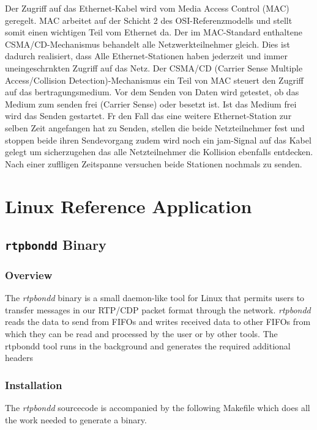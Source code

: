 \documentclass[a4paper]{book}%
\begin{document}
Der Zugriff auf das Ethernet-Kabel wird vom Media Access Control (MAC) geregelt. MAC arbeitet auf der Schicht 2 des OSI-Referenzmodells und stellt somit einen wichtigen Teil vom Ethernet da. Der im MAC-Standard enthaltene CSMA/CD-Mechanismus behandelt alle Netzwerkteilnehmer gleich. Dies ist dadurch realisiert, dass Alle Ethernet-Stationen haben jederzeit und immer uneingeschrnkten Zugriff auf das Netz. Der CSMA/CD (Carrier Sense Multiple Access/Collision Detection)-Mechanismus ein Teil von MAC steuert den Zugriff auf das bertragungsmedium. Vor dem Senden von Daten wird getestet, ob das Medium zum senden frei (Carrier Sense) oder besetzt ist. Ist das Medium frei wird das Senden gestartet. Fr den Fall das eine weitere Ethernet-Station zur selben Zeit angefangen hat zu Senden, stellen die beide Netzteilnehmer fest und stoppen beide ihren Sendevorgang zudem wird noch ein jam-Signal auf das Kabel gelegt um sicherzugehen das alle Netzteilnehmer die Kollision ebenfalls entdecken. Nach einer zuflligen Zeitspanne versuchen beide Stationen nochmals zu senden.



\chapter{Linux Reference Application}
\section{\texttt{rtpbondd} Binary}
\subsection{Overview}

The \emph{rtpbondd} binary is a small daemon-like tool for Linux that permits users to transfer messages in our RTP/CDP packet format through the network. \emph{rtpbondd} reads the data to send from FIFOs and writes received data to other FIFOs from which they can be read and processed by the user or by other tools. The rtpbondd tool runs in the background and generates the required additional headers 

\subsection{Installation}

The \emph{rtpbondd} sourcecode is accompanied by the following Makefile which does all the work needed to generate a binary.
\end{document}
